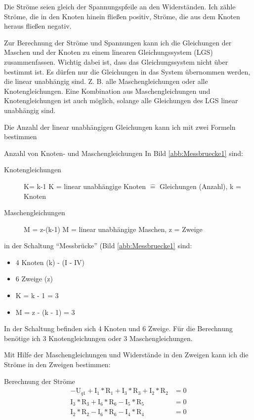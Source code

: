 Die Ströme seien gleich der Spannungspfeile an den Widerständen.
Ich zähle Ströme, die in den Knoten hinein fließen positiv, Ströme, die aus dem Knoten heraus fließen negativ.

Zur Berechnung der Ströme und Spannungen kann ich die Gleichungen der Maschen und der Knoten zu einem linearen Gleichungssystem (LGS) zusammenfassen. Wichtig dabei ist, dass das Gleichungssystem nicht über bestimmt ist. Es dürfen nur die Gleichungen in das System übernommen werden, die linear unabhängig sind. Z. B. alle Maschengleichungen oder alle Knotengleichungen. Eine Kombination aus Maschengleichungen und Knotengleichungen ist auch möglich, solange alle Gleichungen des LGS linear unabhängig sind.

Die Anzahl der linear unabhängigen Gleichungen kann ich mit zwei Formeln bestimmen

\begin{frame}{Anzahl von Knoten- und Maschengleichungen}
  In Bild \ref{abb:Messbruecke1} sind:
  \begin{description}
    \item[Knotengleichungen] K= k-1 K = linear unabhängige Knoten $\hat=$ Gleichungen (Anzahl), k = Knoten
    \item[Maschengleichungen]  M = z-(k-1) M = linear unabhängige Maschen, z = Zweige
\end{description}
in der Schaltung "`Messbrücke"' (Bild \ref{abb:Messbruecke1} sind:
\begin{itemize}
 \item 4 Knoten (k) - (I - IV)
 \item 6 Zweige (z)
 \item K = k - 1 = 3
 \item M = z - (k - 1) = 3
\end{itemize}

\end{frame}

In der Schaltung befinden sich 4 Knoten und 6 Zweige.
Für die Berechnung benötige ich 3 Knotengleichungen oder 3 Maschengleichungen.

Mit Hilfe der Maschengleichungen und Widerstände in den Zweigen kann ich die Ströme in den Zweigen bestimmen:

\begin{frame}{Berechnung der Ströme}
\begin{align}
  -\text{U}_{q1} + \text{I}_1 * \text{R}_1 + \text{I}_3 * \text{R}_3 + \text{I}_2 * \text{R}_2 &= 0\\
\text{I}_3 * \text{R}_3 + \text{I}_6 * \text{R}_6 - \text{I}_5 * \text{R}_5 &= 0 \\
\text{I}_2 * \text{R}_2 - \text{I}_6 * \text{R}_6 - \text{I}_4 * \text{R}_4 &= 0
\end{align}
\end{frame}


